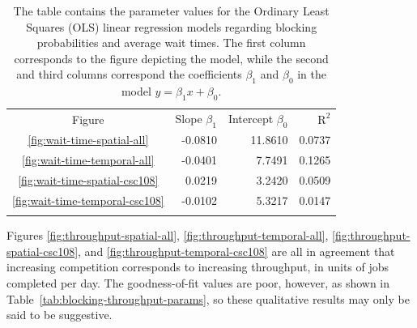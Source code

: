 \begin{table}
\caption{The table contains the parameter values for the Ordinary Least Squares
(OLS) linear regression models regarding blocking probabilities and average
wait times. The first column corresponds to the figure depicting the model,
while the second and third columns correspond the coefficients $\beta_1$ and
$\beta_0$ in the model $y = \beta_{1}x + \beta_0$.}
\label{tab:blocking-wait-time-params}       %
\begin{tabular}{crrr}
\hline\noalign{\smallskip}
Figure  & Slope $\beta_1$ & Intercept $\beta_0$     & $\text{R}^2$ \\
\noalign{\smallskip}\hline\noalign{\smallskip}
\ref{fig:wait-time-spatial-all}     &   -0.0810 &   11.8610 &   0.0737  \\
\ref{fig:wait-time-temporal-all}    &   -0.0401 &    7.7491 &   0.1265  \\
\ref{fig:wait-time-spatial-csc108}  &    0.0219 &    3.2420 &   0.0509  \\
\ref{fig:wait-time-temporal-csc108} &   -0.0102 &    5.3217 &   0.0147  \\
\noalign{\smallskip}\hline
\end{tabular}
\end{table}


Figures \ref{fig:throughput-spatial-all}, \ref{fig:throughput-temporal-all},
\ref{fig:throughput-spatial-csc108}, and \ref{fig:throughput-temporal-csc108}
are all in agreement that increasing competition corresponds to increasing
throughput, in units of jobs completed per day. The goodness-of-fit values are
poor, however, as shown in Table~\ref{tab:blocking-throughput-params}, so these qualitative results may only be said to be suggestive.

